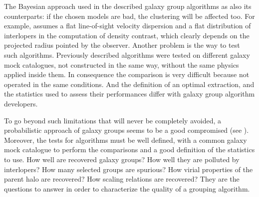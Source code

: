 The Bayesian approach used in the described galaxy group algorithms as also its
counterparts: if the chosen models are bad, the clustering will be affected
too. For example, \citet{Yang+05} assumes a flat line-of-sight velocity
dispersion and a flat distribution of interlopers in the computation of density
contrast, which clearly depends on the projected radius pointed by the
observer. Another problem is the way to test such algorithms. Previously
described algorithms were tested on different galaxy mock catalogues, not
constructed in the same way, without the same physics applied inside them. In
consequence the comparison is very difficult because not operated in the same
conditions. And the definition of an optimal extraction, and the statistics
used to assess their performances differ with galaxy group algorithm
developers.

To go beyond such limitations that will never be completely avoided,
a probabilistic approach of galaxy groups seems to be a good compromised (see
). Moreover, the tests for algorithms must be well
defined, with a common galaxy mock catalogue to perform the comparisons and a
good definition of the statistics to use. How well are recovered galaxy groups?
How well they are polluted by interlopers? How many selected groups are
spurious? How virial properties of the parent halo are recovered? How scaling
relations are recovered? They are the questions to answer in order to
characterize the quality of a grouping algorithm.

